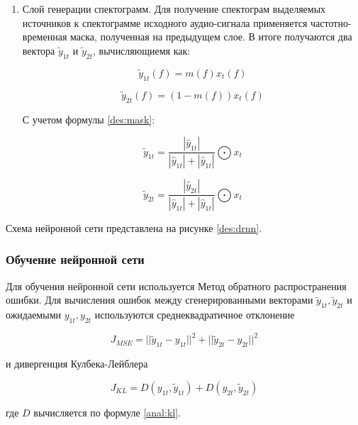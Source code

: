 \begin{enumerate}
	\item Слой генерации спектограмм. Для получение спектограм выделяемых источников к спектограмме исходного аудио-сигнала применяется частотно-временная маска, полученная на предыдущем слое. В итоге получаются два вектора $\tilde{y}_{1t}$ и $\tilde{y}_{2t}$, вычисляющиемя как:
	
	\begin{equation}
	\tilde{y}_{1t}(f) = m(f)x_t(f)
	\end{equation}
	
	
	\begin{equation}
	\tilde{y}_{2t}(f) = (1 - m(f))x_t(f)
	\end{equation}
	
	С учетом формулы \ref{des:mask}:
	
	\begin{equation}
	\tilde{y}_{1t} = \frac{|\hat{y}_{1t}|}{|\hat{y}_{1t}| + |\hat{y}_{1t}|} \bigodot x_t
	\end{equation}
	
	
	\begin{equation}
	\tilde{y}_{2t} = \frac{|\hat{y}_{2t}|}{|\hat{y}_{1t}| + |\hat{y}_{1t}|} \bigodot x_t
	\end{equation}
	
\end{enumerate}

Схема нейронной сети представлена на рисунке \ref{des:drnn}.

\subsubsection{Обучение нейронной сети}

Для обучения нейронной сети используется Метод обратного распространения ошибки. Для вычисления ошибок между сгенерированными векторами $ \tilde{y}_{1t}, \tilde{y}_{2t} $ и ожидаемыми $ y_{1t}, y_{2t} $ используются среднеквадратичное отклонение

\begin{equation}
J_{MSE} = || \tilde{y}_{1t} - y_{1t} ||^2 + || \tilde{y}_{2t} - y_{2t} ||^2
\end{equation}

и дивергенция Кулбека-Лейблера

\begin{equation}
J_{KL} = D(y_{1t}, \tilde{y}_{1t}) + D(y_{2t}, \tilde{y}_{2t})
\end{equation}

где $D$ вычисляется по формуле \ref{anal:kl}.

